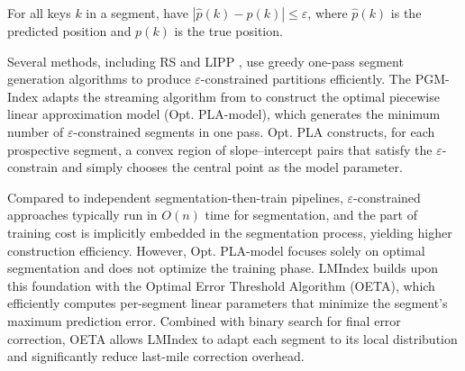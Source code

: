 \begin{constraint}
\label{cons:epsi}
    For all keys $k$ in a segment, have $|\hat{p}(k) - p(k)| \le \varepsilon$, where $\hat{p}(k)$ is the predicted position and $p(k)$ is the true position.
\end{constraint}

Several methods, including RS \cite{radixspline20} and LIPP \cite{lipp21}, use greedy one-pass segment generation algorithms to produce $\varepsilon$-constrained partitions efficiently. The PGM-Index \cite{pgm20} adapts the streaming algorithm from \cite{line81} to construct the optimal piecewise linear approximation model (Opt. PLA-model), which generates the minimum number of $\varepsilon$-constrained segments in one pass. Opt. PLA constructs, for each prospective segment, a convex region of slope–intercept pairs that satisfy the $\varepsilon$-constrain and simply chooses the central point as the model parameter.


Compared to independent segmentation-then-train pipelines, $\varepsilon$-constrained approaches typically run in $O(n)$ time for segmentation, and the part of training cost is implicitly embedded in the segmentation process, yielding higher construction efficiency. However, Opt. PLA-model focuses solely on optimal segmentation and does not optimize the training phase. LMIndex builds upon this foundation with the Optimal Error Threshold Algorithm (OETA), which efficiently computes per-segment linear parameters that minimize the segment’s maximum prediction error. Combined with binary search for final error correction, OETA allows LMIndex to adapt each segment to its local distribution and significantly reduce last-mile correction overhead.

